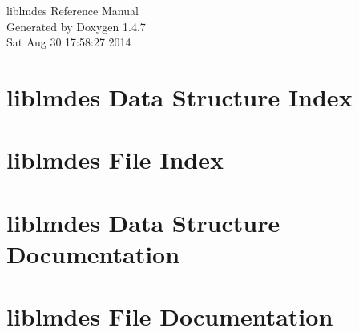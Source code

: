 \documentclass[letterpaper]{book}
\begin{document}
\begin{titlepage}
\vspace*{7cm}
\begin{center}
{\Large liblmdes Reference Manual}\\
\vspace*{1cm}
{\large Generated by Doxygen 1.4.7}\\
\vspace*{0.5cm}
{\small Sat Aug 30 17:58:27 2014}\\
\end{center}
\end{titlepage}
\clearemptydoublepage
{}
\tableofcontents
\clearemptydoublepage
{}
\chapter{liblmdes Data Structure Index}

\chapter{liblmdes File Index}

\chapter{liblmdes Data Structure Documentation}





























\chapter{liblmdes File Documentation}










\printindex
\end{document}
